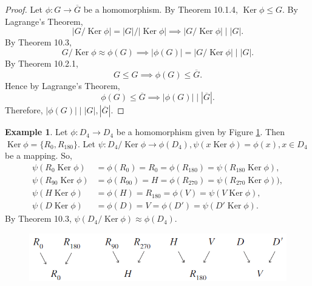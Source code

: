 \documentclass{article}
\theoremstyle{definition}
\newtheorem{example}{Example}[section]
\DeclareMathOperator{\Ker}{Ker}
\begin{document}
    \begin{proof}
       Let $\phi:G\to\overline{G}$ be a homomorphism. By Theorem 10.1.4, $\Ker\phi\leq G$. By Lagrange's Theorem,
       \begin{equation*}
           |G/\Ker\phi|=|G|/|\Ker\phi| \implies |G/\Ker\phi|\mid|G|.
       \end{equation*}
       By Theorem 10.3,
       \begin{equation*}
           G/\Ker\phi\approx\phi(G) \implies |\phi(G)|=|G/\Ker\phi|\mid|G|.
       \end{equation*}
       By Theorem 10.2.1, 
       \begin{equation*}
           G\leq G \implies \phi(G)\leq\overline{G}.
       \end{equation*}
       Hence by Lagrange's Theorem,
       \begin{equation*}
           \phi(G)\leq\overline{G} \implies |\phi(G)|\mid|\overline{G}|.
       \end{equation*}
       Therefore, $|\phi(G)|\mid|G|,|\overline{G}|$.
    \end{proof}
    
    \begin{example}
        Let $\phi:D_4\to D_4$ be a homomorphism given by Figure \ref{exp10.12}. Then $\Ker\phi=\{R_0,R_{180}\}$. Let $\psi:D_4/\Ker\phi\to\phi(D_4), \psi(x\Ker\phi)=\phi(x),x\in D_4$ be a mapping. So,
        \begin{align*}
            \psi(R_0\Ker\phi)&=\phi(R_0)=R_0=\phi(R_{180})=\psi(R_{180}\Ker\phi), \\ \psi(R_{90}\Ker\phi)&=\phi(R_{90})=H=\phi(R_{270})=\psi(R_{270}\Ker\phi)), \\
            \psi(H\Ker\phi)&=\phi(H)=R_{180}=\phi(V)=\psi(V\Ker\phi), \\
            \psi(D\Ker\phi)&=\phi(D)=V=\phi(D')=\psi(D'\Ker\phi).
        \end{align*}
        By Theorem 10.3, $\psi(D_4/\Ker\phi)\approx\phi(D_4)$.
    \end{example}
    
    \begin{figure}[!htbp]
        \centering
        \includegraphics[width=0.7\linewidth]{figures/exp10.12.png}
        \caption{}
        \label{exp10.12}
    \end{figure}
    
\end{document}
